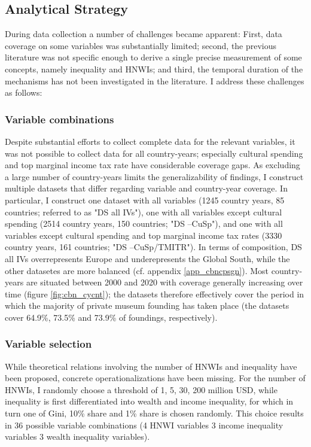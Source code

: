 \documentclass[11pt]{article}
\begin{document}
\subsection*{Analytical Strategy}


During data collection a number of challenges became apparent:
First, data coverage on some variables was substantially limited; second, the previous literature was not specific enough to derive a single precise measurement of some concepts, namely inequality and HNWIs; and third, the temporal duration of the mechanisms has not been investigated in the literature. 
I address these challenges as follows: 

\subsubsection*{Variable combinations}

Despite substantial efforts to collect complete data for the relevant variables, it was not possible to collect data for all country-years; especially cultural spending and top marginal income tax rate have considerable coverage gaps.
As excluding a large number of country-years limits the generalizability of findings, I construct multiple datasets that differ regarding variable and country-year coverage.
In particular, I construct one dataset with all variables (1245 country years, 85 countries; referred to as "DS all IVs"), one with all variables except cultural spending (2514 country years, 150 countries; "DS --CuSp"), and one with all variables except cultural spending and top marginal income tax rates (3330 country years, 161 countries; "DS --CuSp/TMITR").
In terms of composition, DS all IVs overrepresents Europe and underepresents the Global South, while the other datasetes are more balanced (cf. appendix \ref{app_cbncpsgn}).
Most country-years are situated between 2000 and 2020 with coverage generally increasing over time (figure \ref{fig:cbn_cycnt}); the datasets therefore effectively cover the period in which the majority of private museum founding has taken place (the datasets cover 64.9\%, 73.5\% and 73.9\% of foundings, respectively).

\subsubsection*{Variable selection}
\label{vrbl_slctn}
While theoretical relations involving the number of HNWIs and inequality have been proposed, concrete operationalizations have been missing.
For the number of HNWIs, I randomly choose a threshold of 1, 5, 30, 200 million USD, while inequality is first differentiated into wealth and income inequality, for which in turn one of Gini, 10\% share and 1\% share is chosen randomly.
This choice results in 36 possible variable combinations (4 HNWI variables \texttimes{} 3 income inequality variables \texttimes{} 3 wealth inequality variables). 
\end{document}
